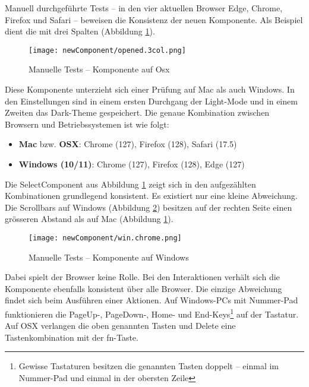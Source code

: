 Manuell durchgeführte Tests – in den vier aktuellen Browser Edge, Chrome, Firefox und Safari – beweisen die Konsistenz der neuen Komponente. 
Als Beispiel dient die  mit drei Spalten (Abbildung \ref{img:manualTestComponentOsx}). 

\begin{figure}[!htb]
    \centering
    \texttt{[image: newComponent/opened.3col.png]}
    \caption{\centering Manuelle Tests – Komponente auf Osx}
    \label{img:manualTestComponentOsx}
\end{figure}

Diese Komponente unterzieht sich einer Prüfung auf Mac als auch Windows. 
In den Einstellungen sind in einem ersten Durchgang der Light-Mode und in einem Zweiten das Dark-Theme gespeichert. 
Die genaue Kombination zwischen Browsern und Betriebssystemen ist wie folgt: 

\begin{itemize}
    \item \textbf{Mac} bzw. \textbf{OSX}: Chrome (127), Firefox (128), Safari (17.5)
    \item \textbf{Windows (10/11)}: Chrome (127), Firefox (128), Edge (127)
\end{itemize}

Die SelectComponent aus Abbildung \ref{img:manualTestComponentOsx} zeigt sich in den aufgezählten Kombinationen grundlegend konsistent. 
Es existiert nur eine kleine Abweichung. 
Die Scrollbars auf Windows (Abbildung \ref{img:manualTestComponentWin}) besitzen auf der rechten Seite einen grösseren Abstand als auf Mac (Abbildung \ref{img:manualTestComponentOsx}). 

\begin{figure}[!htb]
    \centering
    \texttt{[image: newComponent/win.chrome.png]}
    \caption{\centering Manuelle Tests – Komponente auf Windows}
    \label{img:manualTestComponentWin}
\end{figure}

Dabei spielt der Browser keine Rolle. 
Bei den Interaktionen verhält sich die Komponente ebenfalls konsistent über alle Browser. 
Die einzige Abweichung findet sich beim Ausführen einer Aktionen. 
Auf Windows-PCs mit Nummer-Pad funktionieren die Page\-Up-, Page\-Down-, Home- und End-Keys\footnote{
    Gewisse Tastaturen besitzen die genannten Tasten doppelt – einmal im Nummer-Pad und einmal in der obersten Zeile
} auf der Tastatur. 
Auf OSX verlangen die oben genannten Tasten und Delete eine Tastenkombination mit der fn-Taste. 

